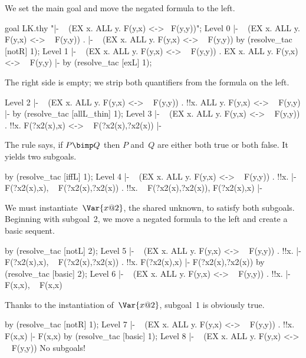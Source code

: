 We set the main goal and move the negated formula to the left.
\begin{ttbox}
goal LK.thy "|- ~ (EX x. ALL y. F(y,x) <-> ~F(y,y))";
{\out Level 0}
{\out  |- ~ (EX x. ALL y. F(y,x) <-> ~ F(y,y))}
{.  |- ~ (EX x. ALL y. F(y,x) <-> ~ F(y,y))}
by (resolve_tac [notR] 1);
{\out Level 1}
{\out  |- ~ (EX x. ALL y. F(y,x) <-> ~ F(y,y))}
{. EX x. ALL y. F(y,x) <-> ~ F(y,y) |-}
by (resolve_tac [exL] 1);
\end{ttbox}
The right side is empty; we strip both quantifiers from the formula on the
left.
\begin{ttbox}
{\out Level 2}
{\out  |- ~ (EX x. ALL y. F(y,x) <-> ~ F(y,y))}
{. !!x. ALL y. F(y,x) <-> ~ F(y,y) |-}
by (resolve_tac [allL_thin] 1);
{\out Level 3}
{\out  |- ~ (EX x. ALL y. F(y,x) <-> ~ F(y,y))}
{. !!x. F(?x2(x),x) <-> ~ F(?x2(x),?x2(x)) |-}
\end{ttbox}
The rule  says, if $P\bimp Q$ then $P$ and~$Q$ are either
both true or both false.  It yields two subgoals.
\begin{ttbox}
by (resolve_tac [iffL] 1);
{\out Level 4}
{\out  |- ~ (EX x. ALL y. F(y,x) <-> ~ F(y,y))}
{. !!x.  |- F(?x2(x),x), ~ F(?x2(x),?x2(x))}
{. !!x. ~ F(?x2(x),?x2(x)), F(?x2(x),x) |-}
\end{ttbox}
We must instantiate~$\Var{x@2}$, the shared unknown, to satisfy both
subgoals.  Beginning with subgoal~2, we move a negated formula to the left
and create a basic sequent.
\begin{ttbox}
by (resolve_tac [notL] 2);
{\out Level 5}
{\out  |- ~ (EX x. ALL y. F(y,x) <-> ~ F(y,y))}
{. !!x.  |- F(?x2(x),x), ~ F(?x2(x),?x2(x))}
{. !!x. F(?x2(x),x) |- F(?x2(x),?x2(x))}
by (resolve_tac [basic] 2);
{\out Level 6}
{\out  |- ~ (EX x. ALL y. F(y,x) <-> ~ F(y,y))}
{. !!x.  |- F(x,x), ~ F(x,x)}
\end{ttbox}
Thanks to the instantiation of~$\Var{x@2}$, subgoal~1 is obviously true.
\begin{ttbox}
by (resolve_tac [notR] 1);
{\out Level 7}
{\out  |- ~ (EX x. ALL y. F(y,x) <-> ~ F(y,y))}
{. !!x. F(x,x) |- F(x,x)}
by (resolve_tac [basic] 1);
{\out Level 8}
{\out  |- ~ (EX x. ALL y. F(y,x) <-> ~ F(y,y))}
{\out No subgoals!}
\end{ttbox}
